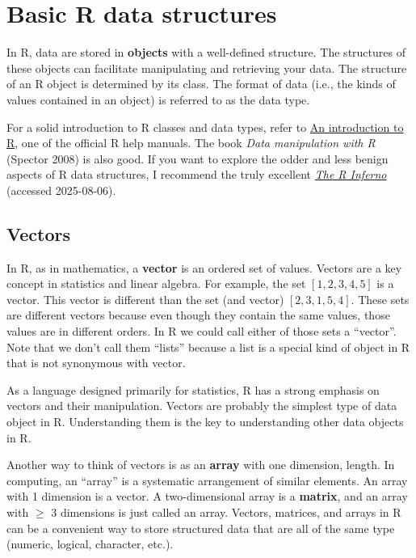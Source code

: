 \documentclass[
  13,
  letterpaper,
]{report}
\begin{document}
\section{Basic R data structures}\label{sec-object-struct}

In R, data are stored in \textbf{objects} with a well-defined structure.
The structures of these objects can facilitate manipulating and
retrieving your data. The structure of an R object is determined by its
class. The format of data (i.e., the kinds of values contained in an
object) is referred to as the data type.

For a solid introduction to R classes and data types, refer to
\href{https://cran.r-project.org/doc/manuals/r-release/R-intro.html}{An
introduction to R}, one of the official R help manuals. The book
\emph{Data manipulation with R} (Spector 2008) is also good. If you want
to explore the odder and less benign aspects of R data structures, I
recommend the truly excellent
\href{https://www.burns-stat.com/pages/Tutor/R_inferno.pdf}{\emph{The R
Inferno}} (accessed 2025-08-06).

\subsection{Vectors}\label{sec-object-struct-vect}

In R, as in mathematics, a \textbf{vector} is an ordered set of values.
Vectors are a key concept in statistics and linear algebra. For example,
the set \([1,2,3,4,5]\) is a vector. This vector is different than the
set (and vector) \([2,3,1,5,4]\). These sets are different vectors
because even though they contain the same values, those values are in
different orders. In R we could call either of those sets a ``vector''.
Note that we don't call them ``lists'' because a list is a special kind
of object in R that is not synonymous with vector.

As a language designed primarily for statistics, R has a strong emphasis
on vectors and their manipulation. Vectors are probably the simplest
type of data object in R. Understanding them is the key to understanding
other data objects in R.

Another way to think of vectors is as an \textbf{array} with one
dimension, length. In computing, an ``array'' is a systematic
arrangement of similar elements. An array with 1 dimension is a vector.
A two-dimensional array is a \textbf{matrix}, and an array with \(\ge\)
3 dimensions is just called an array. Vectors, matrices, and arrays in R
can be a convenient way to store structured data that are all of the
same type (numeric, logical, character, etc.).
\end{document}
